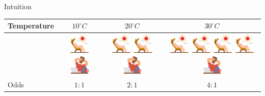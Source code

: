 \documentclass[aspectratio=169]{beamer}
\begin{document}
\begin{frame}[allowframebreaks]{Intuition}
  \begin{tabular}{|l|c|c|c|}
    \hline
    Temperature &  $10^{\circ} C$  &  $20^{\circ} C$ & $30^{\circ} C$  \\
    \hline
    &
    \includegraphics[width = 1cm]{../figures/tanning}
    \includegraphics[width = 1cm]{../figures/relax} &
    \includegraphics[width = 1cm]{../figures/tanning}
    \includegraphics[width = 1cm]{../figures/tanning}
    \includegraphics[width = 1cm]{../figures/relax} &
    \includegraphics[width = 1cm]{../figures/tanning}
    \includegraphics[width = 1cm]{../figures/tanning}
    \includegraphics[width = 1cm]{../figures/tanning}
    \includegraphics[width = 1cm]{../figures/tanning}
    \includegraphics[width = 1cm]{../figures/relax} \\
    Odds & $1:1$  & $2:1$ & $4:1$ \\
    \hline
  \end{tabular}


\end{frame}
\end{document}
